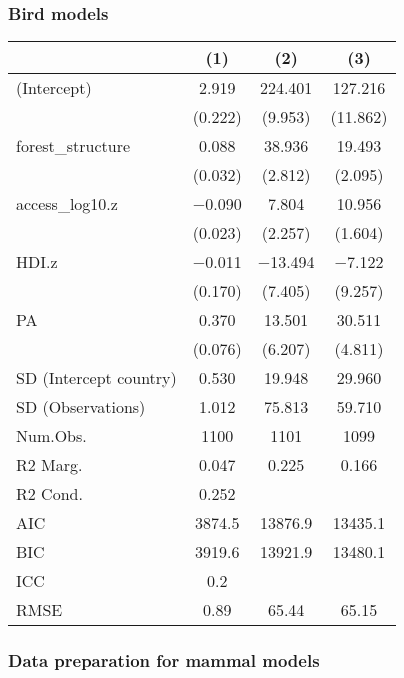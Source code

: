 \documentclass[
]{article}
\begin{document}
\hypertarget{bird-models}{%
\subsubsection{Bird models}\label{bird-models}}

\begin{table}
\centering
\begin{tabular}[t]{lccc}
\toprule
  & (1) & (2) & (3)\\
\midrule
(Intercept) & \num{2.919} & \num{224.401} & \num{127.216}\\
 & (\num{0.222}) & (\num{9.953}) & (\num{11.862})\\
forest\_structure & \num{0.088} & \num{38.936} & \num{19.493}\\
 & (\num{0.032}) & (\num{2.812}) & (\num{2.095})\\
access\_log10.z & \num{-0.090} & \num{7.804} & \num{10.956}\\
 & (\num{0.023}) & (\num{2.257}) & (\num{1.604})\\
HDI.z & \num{-0.011} & \num{-13.494} & \num{-7.122}\\
 & (\num{0.170}) & (\num{7.405}) & (\num{9.257})\\
PA & \num{0.370} & \num{13.501} & \num{30.511}\\
 & (\num{0.076}) & (\num{6.207}) & (\num{4.811})\\
SD (Intercept country) & \num{0.530} & \num{19.948} & \num{29.960}\\
SD (Observations) & \num{1.012} & \num{75.813} & \num{59.710}\\
\midrule
Num.Obs. & \num{1100} & \num{1101} & \num{1099}\\
R2 Marg. & \num{0.047} & \num{0.225} & \num{0.166}\\
R2 Cond. & \num{0.252} &  & \\
AIC & \num{3874.5} & \num{13876.9} & \num{13435.1}\\
BIC & \num{3919.6} & \num{13921.9} & \num{13480.1}\\
ICC & \num{0.2} &  & \\
RMSE & \num{0.89} & \num{65.44} & \num{65.15}\\
\bottomrule
\end{tabular}
\end{table}

\hypertarget{data-preparation-for-mammal-models}{%
\subsubsection{Data preparation for mammal
models}\label{data-preparation-for-mammal-models}}
\end{document}
